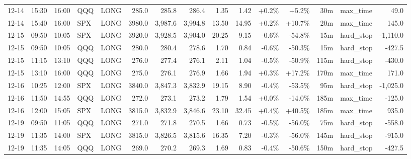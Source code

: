 \documentclass[11pt,a4paper,twoside]{article}
\begin{document}
\begin{landscape}
\begin{center}
\begin{longtable}{>{\color{txtmain}}l l l l l r r r r r r r r >{\color{txtmain}}l r}
12-14 & 15:30 & 16:00 & QQQ & LONG & 285.0 & 285.8 & 286.4 & 1.35 & 1.42 & \textcolor{wingreen}{+0.2\%} & \textcolor{wingreen}{+5.2\%} & 30m & max\_time & \textcolor{wingreen}{49.0} \\
12-14 & 15:40 & 16:00 & SPX & LONG & 3980.0 & 3,987.6 & 3,994.8 & 13.50 & 14.95 & \textcolor{wingreen}{+0.2\%} & \textcolor{wingreen}{+10.7\%} & 20m & max\_time & \textcolor{wingreen}{145.0} \\
12-15 & 09:50 & 10:05 & SPX & LONG & 3920.0 & 3,928.5 & 3,904.0 & 20.25 & 9.15 & \textcolor{lossred}{-0.6\%} & \textcolor{lossred}{-54.8\%} & 15m & hard\_stop & \textcolor{lossred}{-1,110.0} \\
12-15 & 09:50 & 10:05 & QQQ & LONG & 280.0 & 280.4 & 278.6 & 1.70 & 0.84 & \textcolor{lossred}{-0.6\%} & \textcolor{lossred}{-50.3\%} & 15m & hard\_stop & \textcolor{lossred}{-427.5} \\
12-15 & 11:15 & 13:10 & QQQ & LONG & 276.0 & 277.4 & 276.1 & 2.11 & 1.04 & \textcolor{lossred}{-0.5\%} & \textcolor{lossred}{-50.9\%} & 115m & hard\_stop & \textcolor{lossred}{-430.0} \\
12-15 & 13:10 & 16:00 & QQQ & LONG & 275.0 & 276.1 & 276.9 & 1.66 & 1.94 & \textcolor{wingreen}{+0.3\%} & \textcolor{wingreen}{+17.2\%} & 170m & max\_time & \textcolor{wingreen}{171.0} \\
12-16 & 10:25 & 12:00 & SPX & LONG & 3840.0 & 3,847.3 & 3,832.9 & 19.15 & 8.90 & \textcolor{lossred}{-0.4\%} & \textcolor{lossred}{-53.5\%} & 95m & hard\_stop & \textcolor{lossred}{-1,025.0} \\
12-16 & 11:50 & 14:55 & QQQ & LONG & 272.0 & 273.1 & 273.2 & 1.79 & 1.54 & \textcolor{wingreen}{+0.0\%} & \textcolor{lossred}{-14.0\%} & 185m & max\_time & \textcolor{lossred}{-125.0} \\
12-16 & 12:00 & 15:05 & SPX & LONG & 3815.0 & 3,832.9 & 3,846.6 & 23.10 & 32.45 & \textcolor{wingreen}{+0.4\%} & \textcolor{wingreen}{+40.5\%} & 185m & max\_time & \textcolor{wingreen}{935.0} \\
12-19 & 09:50 & 11:05 & QQQ & LONG & 271.0 & 271.8 & 270.5 & 1.66 & 0.73 & \textcolor{lossred}{-0.5\%} & \textcolor{lossred}{-56.0\%} & 75m & hard\_stop & \textcolor{lossred}{-558.0} \\
12-19 & 11:35 & 14:00 & SPX & LONG & 3815.0 & 3,826.5 & 3,815.6 & 16.35 & 7.20 & \textcolor{lossred}{-0.3\%} & \textcolor{lossred}{-56.0\%} & 145m & hard\_stop & \textcolor{lossred}{-915.0} \\
12-19 & 11:35 & 14:05 & QQQ & LONG & 269.0 & 270.2 & 269.3 & 1.69 & 0.83 & \textcolor{lossred}{-0.4\%} & \textcolor{lossred}{-50.6\%} & 150m & hard\_stop & \textcolor{lossred}{-427.5} \\

\end{longtable}
\end{center}
\end{landscape}
\end{document}
